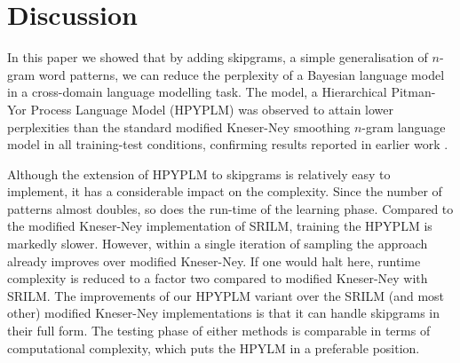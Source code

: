 \section{Discussion}
In this paper we showed that by adding skipgrams, a simple generalisation of $n$-gram word patterns, we can reduce the perplexity of a Bayesian language model in a cross-domain language modelling task. The model, a Hierarchical Pitman-Yor Process Language Model (HPYPLM) was observed to attain lower perplexities than the standard modified Kneser-Ney smoothing $n$-gram language model in all training-test conditions, confirming results reported in earlier work \cite{teh2006hierarchical}.

Although the extension of HPYPLM to skipgrams is relatively easy to implement, it has a considerable impact on the complexity. Since the number of patterns almost doubles, so does the run-time of the learning phase. Compared to the modified Kneser-Ney implementation of SRILM, training the HPYPLM is markedly slower. However, within a single iteration of sampling the approach already improves over modified Kneser-Ney. If one would halt here, runtime complexity is reduced to a factor two compared to modified Kneser-Ney with SRILM. The improvements of our HPYPLM variant over the SRILM (and most other) modified Kneser-Ney implementations is that it can handle skipgrams in their full form. The testing phase of either methods is comparable in terms of computational complexity, which puts the HPYLM in a preferable position.